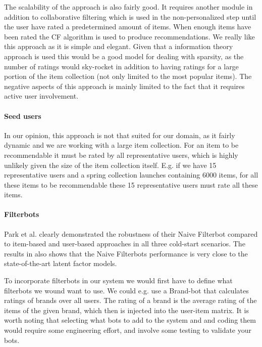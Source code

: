 The scalability of the approach is also fairly good. It requires another module
in addition to collaborative filtering which is used in the non-personalized
step until the user have rated a predetermined amount of items. When enough
items have been rated the CF algorithm is used to produce recommendations. We
really like this approach as it is simple and elegant. Given that a information
theory approach is used this would be a good model for dealing with sparsity,
as the number of ratings would sky-rocket in addition to having ratings for a
large portion of the item collection (not only limited to the most popular
items). The negative aspects of this approach is mainly limited to the fact
that it requires active user involvement.\newline

\paragraph{Seed users}

In our opinion, this approach is not that suited for our domain, as it fairly
dynamic and we are working with a large item collection. For an item to be
recommendable it must be rated by all representative users, which is highly
unlikely given the size of the item collection itself. E.g. if we have 15
representative users and a spring collection launches containing 6000 items,
for all these items to be recommendable these 15 representative users must rate
all these items.

\paragraph{Filterbots}

Park et al. \cite{Park2006} clearly demonstrated the robustness of their Naive
Filterbot compared to item-based and user-based approaches in all three
cold-start scenarios. The results in \cite{Agarwal2009, Agarwal2010} also shows
that the Naive Filterbots performance is very close to the state-of-the-art
latent factor models.

To incorporate filterbots in our system we would first have to define what
filterbots we wound want to use. We could e.g. use a Brand-bot that calculates
ratings of brands over all users. The rating of a brand is the average rating
of the items of the given brand, which then is injected into the user-item
matrix. It is worth noting that selecting what bots to add to the system and
and coding them would require some engineering effort, and involve some testing
to validate your bots.

